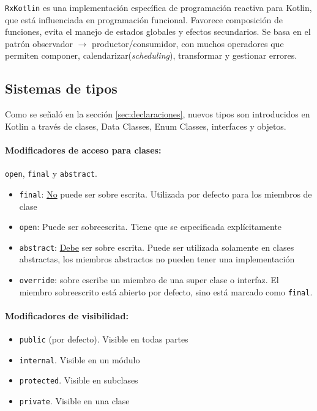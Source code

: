 \texttt{RxKotlin} es una implementación específica de programación reactiva para Kotlin, que está influenciada en programación funcional. Favorece composición de funciones, evita el manejo de estados globales y efectos secundarios. Se basa en el patrón observador $\rightarrow$ productor/consumidor, con muchos operadores que permiten componer, calendarizar(\emph{scheduling}), transformar y gestionar errores.
 

\subsection{Sistemas de tipos} \label{sec:tipos}
Como se señaló en la sección \ref{sec:declaraciones}, nuevos tipos son introducidos en Kotlin a través de clases, Data Classes, Enum Classes, interfaces y objetos. 

\paragraph{Modificadores de acceso para clases:} \texttt{open}, \texttt{final} y \texttt{abstract}. 
\begin{itemize}
    \item \texttt{final}: \underline{No} puede ser sobre escrita. Utilizada por defecto para los miembros de clase
    \item \texttt{open}: Puede ser sobreescrita. Tiene que se especificada explícitamente
    \item \texttt{abstract}: \underline{Debe} ser sobre escrita. Puede ser utilizada solamente en clases abstractas, los miembros abstractos no pueden tener una implementación
    \item \texttt{override}: sobre escribe un miembro de una super clase o interfaz. El miembro sobreescrito está abierto por defecto, sino está marcado como \texttt{final}. 
\end{itemize}

\paragraph{Modificadores de visibilidad:} 
\begin{itemize}
    \item \texttt{public} (por defecto). Visible en todas partes
    \item \texttt{internal}. Visible en un módulo
    \item \texttt{protected}. Visible en subclases
    \item \texttt{private}. Visible en una clase
\end{itemize}

